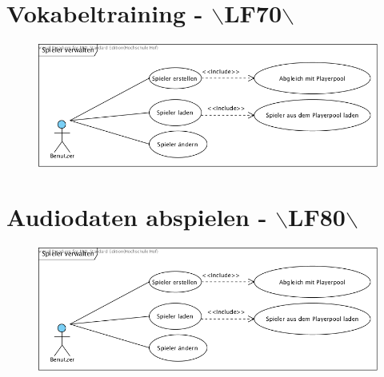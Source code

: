 \clearpage
\section{Vokabeltraining - $\backslash$LF70$\backslash$}
\begin{figure}[!h]
	\centering
    \includegraphics[width=\textwidth]{./SpielerVerwalten.png}
	\label{layout_gesamt}
\end{figure}

\clearpage
\section{Audiodaten abspielen - $\backslash$LF80$\backslash$}
\begin{figure}[!h]
	\centering
    \includegraphics[width=\textwidth]{./SpielerVerwalten.png}
	\label{layout_gesamt}
\end{figure}

